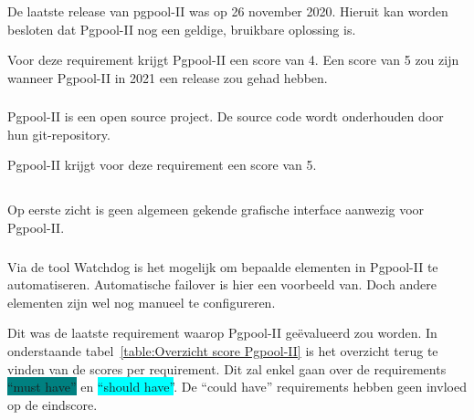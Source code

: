 De laatste release van pgpool-II was op 26 november 2020. Hieruit kan worden besloten dat Pgpool-II nog een geldige, bruikbare oplossing is.

Voor deze requirement krijgt Pgpool-II een score van 4. Een score van 5 zou zijn wanneer Pgpool-II in 2021 een release zou gehad hebben.

\subsubsection{}
\label{subsubsec:Open source}

Pgpool-II is een open source project. De source code wordt onderhouden door hun git-repository.

Pgpool-II krijgt voor deze requirement een score van 5.

\subsection{}
\label{subsec:Could have}


\subsubsection{}
\label{subsubsec:Grafische interface}

Op eerste zicht is geen algemeen gekende grafische interface aanwezig voor Pgpool-II.

\subsubsection{}
\label{subsubsec:Beperkte manuele interventie}

Via de tool Watchdog is het mogelijk om bepaalde elementen in Pgpool-II te automatiseren. Automatische failover is hier een voorbeeld van. Doch andere elementen zijn wel nog manueel te configureren.


Dit was de laatste requirement waarop Pgpool-II geëvalueerd zou worden. In onderstaande tabel~\ref{table:Overzicht score Pgpool-II} is het overzicht terug te vinden van de scores per requirement. Dit zal enkel gaan over de requirements \colorbox{teal}{“must have”} en \colorbox{cyan}{“should have”}. De “could have” requirements hebben geen invloed op de eindscore.

